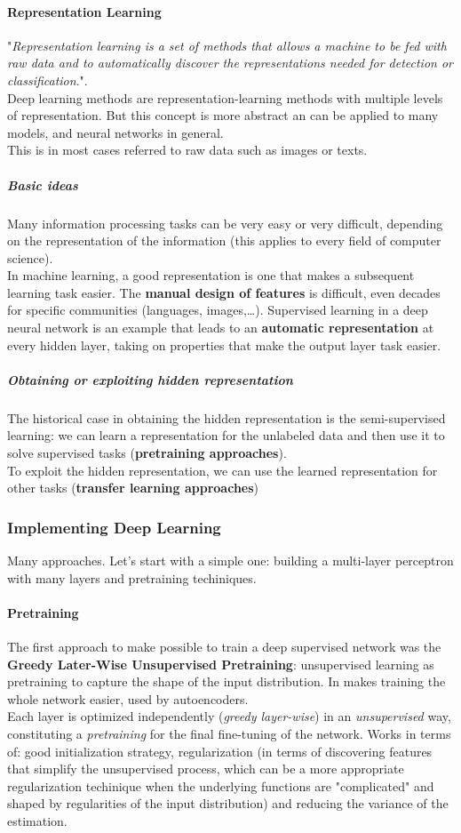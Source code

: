 \documentclass[10pt]{report}
\begin{document}
\paragraph{Representation Learning} "\textit{Representation learning is a set of methods that allows a machine to be fed with raw data and to automatically discover the representations needed for detection or classification}.".\\
Deep learning methods are representation-learning methods with multiple levels of representation. But this concept is more abstract an can be applied to many models, and neural networks in general.\\
This is in most cases referred to raw data such as images or texts.
\subparagraph{Basic ideas} Many information processing tasks can be very easy or very difficult, depending on the representation of the information (this applies to every field of computer science).\\
In machine learning, a good representation is one that makes a subsequent learning task easier. The \textbf{manual design of features} is difficult, even decades for specific communities (languages, images,\ldots). Supervised learning in a deep neural network is an example that leads to an \textbf{automatic representation} at every hidden layer, taking on properties that make the output layer task easier.
\subparagraph{Obtaining or exploiting hidden representation} The historical case in obtaining the hidden representation is the semi-supervised learning: we can learn a representation for the unlabeled data and then use it to solve supervised tasks (\textbf{pretraining approaches}).\\
To exploit the hidden representation, we can use the learned representation for other tasks (\textbf{transfer learning approaches})
\subsubsection{Implementing Deep Learning} Many approaches. Let's start with a simple one: building a multi-layer perceptron with many layers and pretraining techiniques.
\paragraph{Pretraining} The first approach to make possible to train a deep supervised network was the \textbf{Greedy Later-Wise Unsupervised Pretraining}: unsupervised learning as pretraining to capture the shape of the input distribution. In makes training the whole network easier, used by autoencoders.\\
Each layer is optimized independently (\textit{greedy layer-wise}) in an \textit{unsupervised} way, constituting a \textit{pretraining} for the final fine-tuning of the network. Works in terms of: good initialization strategy, regularization (in terms of discovering features that simplify the unsupervised process, which can be a more appropriate regularization techinique when the underlying functions are "complicated" and shaped by regularities of the input distribution) and reducing the variance of the estimation.
\end{document}
